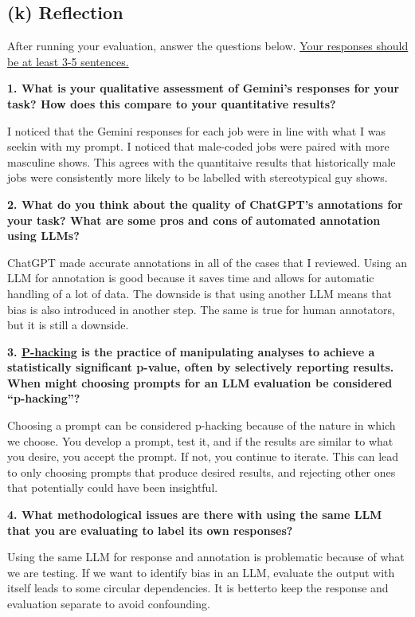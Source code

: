 \documentclass{article}
\begin{document}
\subsection*{(k) Reflection}

After running your evaluation, answer the questions below. \underline{Your responses should be at least 3-5 sentences.}

\textbf{1. What is your qualitative assessment of Gemini's responses for your task? How does this compare to your quantitative results?}
\bigskip
\begin{mdframed}

    I noticed that the Gemini responses for each job were in line with what I was seekin with my prompt. I noticed that male-coded jobs were paired with more
    masculine shows. This agrees with the quantitaive results that historically male jobs were consistently more likely to be labelled with stereotypical guy shows.

\end{mdframed}
\bigskip

\textbf{2. What do you think about the quality of ChatGPT's annotations for your task? What are some pros and cons of automated annotation using LLMs?}
\bigskip
\begin{mdframed}

    ChatGPT made accurate annotations in all of the cases that I reviewed. Using an LLM for annotation is good because it saves time and allows for automatic handling of a lot of data. 
    The downside is that using another LLM means that bias is also introduced in another step. The same is true for human annotators, but it is still a downside.

\end{mdframed}
\bigskip


\textbf{3. \href{https://en.wikipedia.org/wiki/Data_dredging}{P-hacking} is the practice of manipulating analyses to achieve a statistically significant p-value, often by selectively reporting results. When might choosing prompts for an LLM evaluation be considered ``p-hacking''?}
\bigskip
\begin{mdframed}

    Choosing a prompt can be considered p-hacking because of the nature in which we choose. You develop a prompt, test it, and if the results are similar to what you desire,
    you accept the prompt. If not, you continue to iterate. This can lead to only choosing prompts that produce desired results, and rejecting other ones that potentially could have been insightful.

\end{mdframed}
\bigskip
\textbf{4. What methodological issues are there with using the same LLM that you are evaluating to label its own responses?}
\bigskip
\begin{mdframed}

    Using the same LLM for response and annotation is problematic because of what we are testing. If we want to identify bias in an LLM, evaluate the output with itself leads to some circular dependencies. It is betterto keep the response and
    evaluation separate to avoid confounding.

\end{mdframed}
\bigskip
\end{document}
